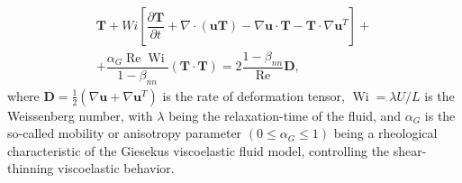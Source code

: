 \documentclass[preprint, 12pt]{elsarticle}
\begin{document}
\begin{align}
    \mathbf{T} + Wi\left[ \dfrac{\partial\mathbf{T}}{\partial t} + \nabla\cdot(\mathbf{uT}) - \nabla\mathbf{u}\cdot\mathbf{T} - \mathbf{T}\cdot\nabla\mathbf{u}^{T} \right] 
    + \nonumber\\ + \dfrac{\alpha_{G}\operatorname{Re}\operatorname{Wi}}{1-\beta_{nn}}\left( \mathbf{T}\cdot\mathbf{T} \right) = 2\dfrac{1-\beta_{nn}}{\operatorname{Re}}\mathbf{D},\label{eq_geral_tensors}
\end{align}
where $\mathbf{D} = \frac{1}{2}\left( \nabla\mathbf{u} + \nabla\mathbf{u}^{T}  \right)$ is the rate of deformation tensor, $\operatorname{Wi} = \lambda U / L$ is the Weissenberg number, with $\lambda$ being the relaxation-time of the fluid, and $\alpha_{G}$ is the so-called mobility or anisotropy parameter $(0\leq \alpha_{G}\leq 1)$ being a rheological characteristic of the Giesekus viscoelastic fluid model, controlling the shear-thinning viscoelastic behavior.
\end{document}
